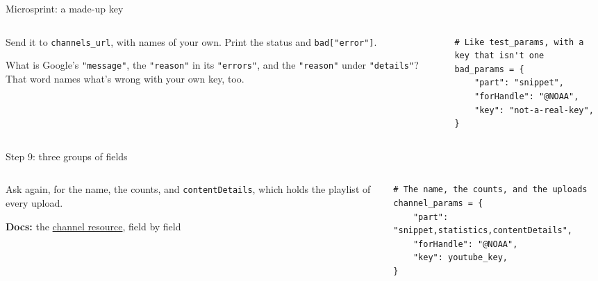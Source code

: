 \documentclass[9pt,aspectratio=169]{beamer}
\begin{document}
\begin{frame}[fragile]{Microsprint: a made-up key}
    \begin{columns}[T]
        \begin{column}{0.37\textwidth}
            Send it to \texttt{channels\_url}, with names of your own. Print the status and \texttt{bad["error"]}.

            \medskip
            What is Google's \texttt{"message"}, the \texttt{"reason"} in its \texttt{"errors"}, and the \texttt{"reason"} under \texttt{"details"}? That word names what's wrong with your own key, too.
        \end{column}
        \begin{column}{0.6\textwidth}
\begin{lstlisting}
# Like test_params, with a key that isn't one
bad_params = {
    "part": "snippet",
    "forHandle": "@NOAA",
    "key": "not-a-real-key",
}
\end{lstlisting}
        \end{column}
    \end{columns}
\end{frame}

\begin{frame}[fragile]{Step 9: three groups of fields}
    \begin{columns}[T]
        \begin{column}{0.37\textwidth}
            Ask again, for the name, the counts, and \texttt{contentDetails}, which holds the playlist of every upload.

            \medskip
            {\scriptsize\textbf{Docs:} the \href{https://developers.google.com/youtube/data/reference/rest/v3/channels}{channel resource}, field by field\par}
        \end{column}
        \begin{column}{0.6\textwidth}
\begin{lstlisting}
# The name, the counts, and the uploads
channel_params = {
    "part": "snippet,statistics,contentDetails",
    "forHandle": "@NOAA",
    "key": youtube_key,
}
\end{lstlisting}
        \end{column}
    \end{columns}
\end{frame}
\end{document}

